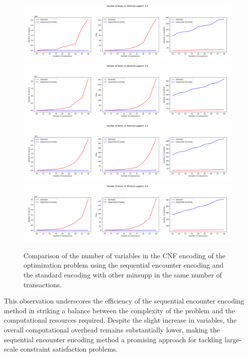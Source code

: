 \begin{figure}[H]
    \centering
    \includegraphics[width=1\textwidth]{chapter4/image/min_supp_0.3.png}
    \includegraphics[width=1\textwidth]{chapter4/image/min_supp_0.4.png}
    \includegraphics[width=1\textwidth]{chapter4/image/min_supp_0.5.png}
    \includegraphics[width=1\textwidth]{chapter4/image/min_supp_0.6.png}
    \caption{Comparison of the number of variables in the CNF encoding of the optimization problem using the sequential encounter encoding and the standard encoding with other minsupp in the same number of transactions.}
    \label{fig:4_5}
\end{figure}

This observation underscores the efficiency of the sequential encounter encoding method in striking a balance between the complexity of the problem and the computational resources required.
Despite the slight increase in variables, the overall computational overhead remains substantially lower,
making the sequential encounter encoding method a promising approach for tackling large-scale constraint satisfaction problems.

